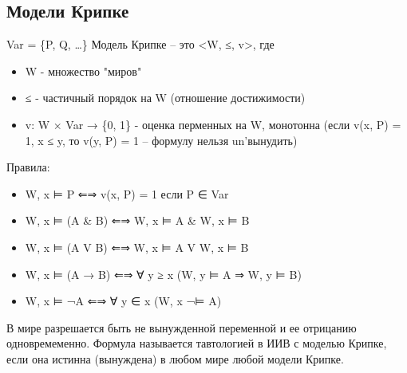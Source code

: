 \documentclass[11pt]{article}
\begin{document}
\subsection{Модели Крипке}
\label{sec-6-1}
Var = \{P, Q, \ldots{}\}
Модель Крипке – это <W, ≤, v>, где
\begin{itemize}
\item W - множество "миров"
\item ≤ - частичный порядок на W (отношение достижимости)
\item v: W × Var → \{0, 1\} - оценка перменных на W, монотонна
(если v(x, P) = 1, x ≤ y, то v(y, P) = 1 – формулу нельзя un'вынудить)
\end{itemize}
Правила:
\begin{itemize}
\item W, x ⊨ P ⇐⇒ v(x, P) = 1 если P ∈ Var
\item W, x ⊨ (A \& B) ⇐⇒ W, x ⊨ A \& W, x ⊨ B
\item W, x ⊨ (A V B) ⇐⇒ W, x ⊨ A V W, x ⊨ B
\item W, x ⊨ (A → B) ⇐⇒ ∀ y ≥ x (W, y ⊨ A ⇒ W, y ⊨ B)
\item W, x ⊨ ¬A ⇐⇒ ∀ y ∈ x (W, x ¬⊨ A)
\end{itemize}

В мире разрешается быть не вынужденной переменной и ее отрицанию
одновремеменно.
Формула называется тавтологией в ИИВ с моделью Крипке, если она
истинна (вынуждена) в любом мире любой модели Крипке.
\end{document}

